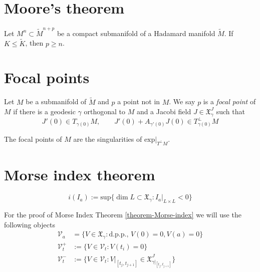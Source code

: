 \section{Moore's theorem}
\label{section-Moore}

\begin{theorem}[Moore]
\label{theorem-Moore}
Let $M^n \subset \tilde{M}^{n+p}$ be a compact submanifold of a Hadamard
manifold $\tilde{M}$. If $K\leq \tilde{K}$, then $p\geq n$.
\end{theorem}

\section{Focal points}
\label{section-focal points}

\begin{definition}
\label{definition-focal-point}
Let $M$ be a submanifold of $\tilde{M}$ and $p$ a point not in $M$. We say $p$
is a {\it focal point} of $M$ if there is a geodesic $\gamma$ orthogonal to $M$
and a Jacobi field $J\in\mathfrak{X}^J_\gamma$ such that
$$
J'(0)\in T_{\gamma(0)}M,\qquad J'(0)+A_{\gamma'(0)}J(0)\in T_{\gamma(0)}^\perp M
$$
\end{definition}

\begin{proposition}
\label{proposition-focal-points-are-singularities-of-normal-exponential}
The focal points of $M$ are the singularities of $\text{exp}|_{T^\perp M}.$
\end{proposition}

\section{Morse index theorem}
\label{section-morse-index}

\begin{definition}
\label{definition-index-index-form}
$$
i(I_a):=\text{sup}\{\dim L \subset \mathfrak{X}_\gamma:I_a |_{L \times L}<0\}
$$
\end{definition}

For the proof of Morse Index Theorem \ref{theorem-Morse-index} we will use the
following objects
\begin{equation}
\label{equation-index-theorem-spaces}
\begin{aligned}
\mathcal{V}_a&=\{V \in \mathfrak{X}_\gamma:\text{d.p.p., }V(0)=0, V(a)=0\}\\
\mathcal{V}_t^+&:=\{V \in \mathcal{V}_t:V(t_i)=0\}\\
\mathcal{V}_t^-& :=\{V \in \mathcal{V}_t:V|_{[t_j,t_{j+1}]}\in
\mathfrak{X}_{\gamma|_{[t_j,t_{j+1}]}}^J\}
\end{aligned}
\end{equation}

